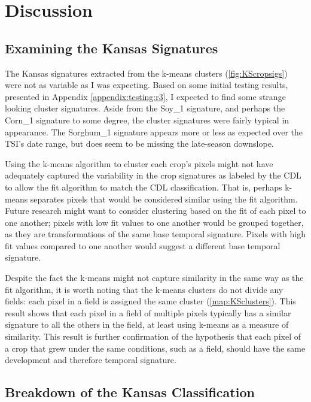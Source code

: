 \chapter{Discussion}

\section{Examining the Kansas Signatures}

The Kansas signatures extracted from the k-means clusters (\autoref{fig:KScropsigs}) were not as variable as I was expecting. Based on some initial testing results, presented in Appendix \ref{appendix:testing:r3}, I expected to find some strange looking cluster signatures. Aside from the Soy\_1 signature, and perhaps the Corn\_1 signature to some degree, the cluster signatures were fairly typical in appearance. The Sorghum\_1 signature appears more or less as expected over the TSI's date range, but does seem to be missing the late-season downslope.

Using the k-means algorithm to cluster each crop's pixels might not have adequately captured the variability in the crop signatures as labeled by the CDL to allow the fit algorithm to match the CDL classification. That is, perhaps k-means separates pixels that would be considered similar using the fit algorithm. Future research might want to consider clustering based on the fit of each pixel to one another; pixels with low fit values to one another would be grouped together, as they are transformations of the same base temporal signature. Pixels with high fit values compared to one another would suggest a different base temporal signature.

Despite the fact the k-means might not capture similarity in the same way as the fit algorithm, it is worth noting that the k-means clusters do not divide any fields: each pixel in a field is assigned the same cluster (\autoref{map:KSclusters}). This result shows that each pixel in a field of multiple pixels typically has a similar signature to all the others in the field, at least using k-means as a measure of similarity. This result is further confirmation of the hypothesis that each pixel of a crop that grew under the same conditions, such as a field, should have the same development and therefore temporal signature.

\section{Breakdown of the Kansas Classification}

